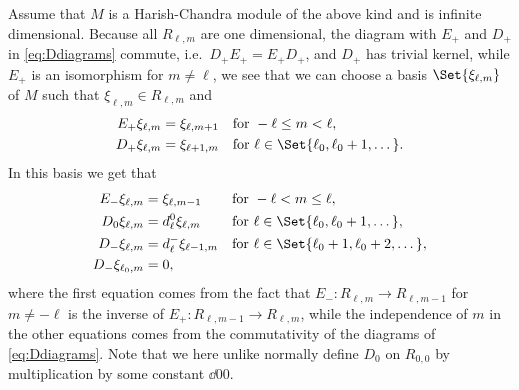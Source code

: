 Assume that $M$ is a Harish-Chandra module of the above kind and is infinite dimensional. Because all $R_{\ell,m}$ are one dimensional, the diagram with $E_+$ and $D_+$ in \cref{eq:Ddiagrams} commute, i.e.\ $D_+E_+=E_+D_+$, and $D_+$ has trivial kernel, while $E_+$ is an isomorphism for $m\neq \ell$, we see that we can choose a basis $\Set{\xi_{\ell,m}}$ of $M$ such that $\xi_{\ell,m}\in R_{\ell,m}$ and
\begin{align*}
  E_+ \xi_{\ell,m} &= \xi_{\ell,m+1} && \mbox{for }-\ell\leq m<\ell,\\
  D_+ \xi_{\ell,m} &= \xi_{\ell+1,m} && \mbox{for }\ell\in\Set{\ell_0,\ell_0+1,\dotsc}.
\end{align*}
In this basis we get that
\begin{align}\label{eq:EandDnewbasis}
  \begin{aligned}
    E_- \xi_{\ell,m} &= \xi_{\ell,m-1} && \mbox{for }-\ell<m\leq \ell, \\
    D_0 \xi_{\ell,m} &= d_\ell^0 \xi_{\ell,m} && \mbox{for }\ell\in\Set{\ell_0,\ell_0+1,\dotsc},\\
    D_- \xi_{\ell,m} &= d_\ell^- \xi_{\ell-1,m} && \mbox{for }\ell\in\Set{\ell_0+1,\ell_0+2,\dotsc},\\
    D_- \xi_{\ell_0,m} &= 0,
  \end{aligned}
\end{align}
where the first equation comes from the fact that $E_-\colon R_{\ell,m}\to R_{\ell,m-1}$ for $m\neq -\ell$ is the inverse of $E_+\colon R_{\ell,m-1}\to R_{\ell,m}$, while the independence of $m$ in the other equations comes from the commutativity of the diagrams of \cref{eq:Ddiagrams}. Note that we here unlike normally define $D_0$ on $R_{0,0}$ by multiplication by some constant $\dd{0}{0}$.

